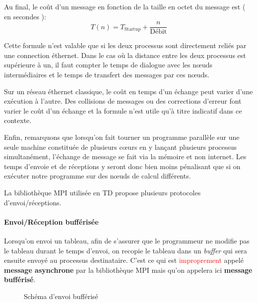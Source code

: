 \documentclass[fleqn,11pt]{article}
\begin{document}
Au final, le coût d'un message en fonction de la taille en octet du message
est ( en secondes ):
\begin{equation}
T(n) = T_{\mbox{Startup}} + \frac{n}{\mbox{Débit}}
\end{equation} 

Cette formule n'est valable que si les deux processus sont directement reliés
par une connection éthernet. Dans le cas où la distance entre les deux processus
est supérieure à un, il faut compter le temps de dialogue avec les n{\oe}uds
intermédiaires et le temps de transfert des messages par ces n{\oe}uds.

Sur un réseau éthernet classique, le coût en temps d'un échange peut varier
d'une exécution à l'autre. Des collisions de messages ou des corrections
d'erreur font varier le coût d'un échange et la formule n'est utile
qu'à titre indicatif dans ce contexte.

Enfin, remarquons que lorsqu'on fait tourner un programme parallèle sur une seule machine
constituée de plusieurs c{\oe}urs en y lançant plusieurs processus simultanément, l'échange de message
se fait via la mémoire et non internet. Les temps d'envoie et de réceptions y seront donc bien moins
pénalisant que si on exécuter notre programme sur des n{\oe}uds de calcul différents.

La bibliothèque MPI utilisée en TD propose plusieurs protocoles d'envoi/réceptions.

\paragraph{Envoi/Réception bufférisée}

Lorsqu'on envoi un tableau, afin de s'assurer que le programmeur ne modifie pas
le tableau durant le temps d'envoi, on recopie le tableau dans un \textsl{buffer}
qui sera ensuite envoyé au processus destinataire. C'est ce qui est 
\textcolor{red}{improprement} appelé \textbf{message asynchrone} par la bibliothèque MPI
mais qu'on appelera ici \textbf{message bufférisé}.

\begin{figure}[h]
\begin{center}
\end{center}
\caption{Schéma d'envoi bufférisé}
\end{figure}
\end{document}
